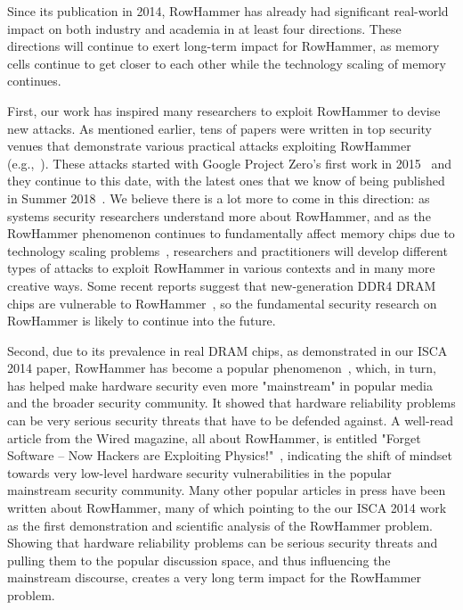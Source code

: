\documentclass[runningheads]{llncs}
\begin{document}
Since its publication in 2014, RowHammer has already had significant
real-world impact on both industry and academia in at least four
directions. These directions will continue to exert long-term impact
for RowHammer, as memory cells continue to get closer to each other
while the technology scaling of memory continues.

First, our work has inspired many researchers to exploit RowHammer to
devise new attacks. As mentioned earlier, tens of papers were written
in top security venues that demonstrate various practical attacks
exploiting RowHammer
(e.g.,~\cite{cloudflops,dedup-est-machina,anotherflip,qiao2016new,bhattacharya2016curious,jang2017sgx,aga2017good,pessl2016drama,rowhammer-js,flip-feng-shui,drammer,glitch-vu}). These
attacks started with Google Project Zero's first work in
2015~\cite{google-project-zero,google-rh-blackhat} and they continue
to this date, with the latest ones that we know of being published in
Summer
2018~\cite{poddebniak2018attacking,nethammer,throwhammer,tatar2018defeating}. We
believe there is a lot more to come in this direction: as systems
security researchers understand more about RowHammer, and as the
RowHammer phenomenon continues to fundamentally affect memory chips
due to technology scaling problems~\cite{onur-date17}, researchers and
practitioners will develop different types of attacks to exploit
RowHammer in various contexts and in many more creative ways. Some
recent reports suggest that new-generation DDR4 DRAM chips are
vulnerable to RowHammer~\cite{rowhammer-thirdio,pessl2016drama,aga2017good,aichinger2015ddr}, so the fundamental security research
on RowHammer is likely to continue into the future.

Second, due to its prevalence in real DRAM chips, as demonstrated in
our ISCA 2014 paper, RowHammer has become a popular
phenomenon~\cite{rowhammer-wikipedia,rh-discuss,rh-twitter,rh-zdnet1,rowhammer-thirdio,google-rh-blackhat,rh-passmark,rh-futureplus,arstechnica_ddr4-rh},
which, in turn, has helped make hardware security even more "mainstream" in popular media and
the broader security community. It showed that hardware reliability 
problems can be very serious security threats that
have to be defended against. A well-read article from the Wired
magazine, all about RowHammer, is entitled "Forget Software -- Now
Hackers are Exploiting Physics!"~\cite{wired-rh}, indicating the shift
of mindset towards very low-level hardware security vulnerabilities in the popular
mainstream security community. Many other popular articles in press
have been written about RowHammer, many of which pointing to the
our ISCA 2014 work~\cite{rowhammer-isca2014} as the first demonstration and scientific analysis of the RowHammer problem. 
Showing that hardware reliability problems can be serious security threats and pulling them to the popular discussion
space, and thus influencing the mainstream discourse, creates a very long
term impact for the RowHammer problem.
\end{document}
